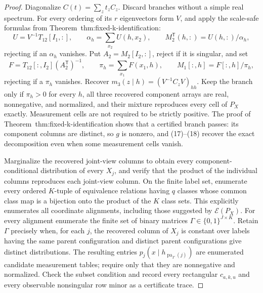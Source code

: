 \documentclass{article}
\begin{document}
\begin{proof}
Diagonalize \(C(t)=\sum_zt_zC_z\).  Discard branches without a simple real spectrum.  For every ordering of its \(r\) eigenvectors form \(V\), and apply the scale-safe formulas from Theorem~\textnormal{thm:fixed-k-identification}:
\[
 U=V^{-1}T_{12}[I_1,:],
 \qquad
 \alpha_h=\sum_{x_2}U(h,x_2),
 \qquad
 M_2^{\mathsf T}(h,:)=U(h,:)/\alpha_h,
\tag{17}
\]
rejecting if an \(\alpha_h\) vanishes.  Put \(A_2=M_2[I_2,:]\), reject if it is singular, and set
\[
 F=T_{12}[:,I_2](A_2^{\mathsf T})^{-1},
 \qquad
 \pi_h=\sum_{x_1}F(x_1,h),
 \qquad
 M_1[:,h]=F[:,h]/\pi_h,
\tag{18}
\]
rejecting if a \(\pi_h\) vanishes.  Recover \(m_3(z\mid h)=(V^{-1}C_zV)_{hh}\).  Keep the branch only if \(\pi_h>0\) for every \(h\), all three recovered component arrays are real, nonnegative, and normalized, and their mixture reproduces every cell of \(P_X\) exactly.  Measurement cells are not required to be strictly positive.  The proof of Theorem~\textnormal{thm:fixed-k-identification} shows that a certified branch passes: its component columns are distinct, so \(g\) is nonzero, and (17)--(18) recover the exact decomposition even when some measurement cells vanish.

Marginalize the recovered joint-view columns to obtain every component-conditional distribution of every \(X_j\), and verify that the product of the individual columns reproduces each joint-view column.  On the finite label set, enumerate every ordered \(K\)-tuple of equivalence relations having \(q\) classes whose common class map is a bijection onto the product of the \(K\) class sets.  This explicitly enumerates all coordinate alignments, including those suggested by \(\mathcal E(P_X)\).  For every alignment enumerate the finite set of binary matrices \(\Gamma\in\{0,1\}^{J\times K}\).  Retain \(\Gamma\) precisely when, for each \(j\), the recovered column of \(X_j\) is constant over labels having the same parent configuration and distinct parent configurations give distinct distributions.  The resulting entries \(p_j(x\mid h_{\operatorname{pa}_\Gamma(j)})\) are enumerated candidate measurement tables; require only that they are nonnegative and normalized.  Check the subset condition and record every rectangular \(c_{a,k,u}\) and every observable nonsingular row minor as a certificate trace.


\end{proof}
\end{document}
